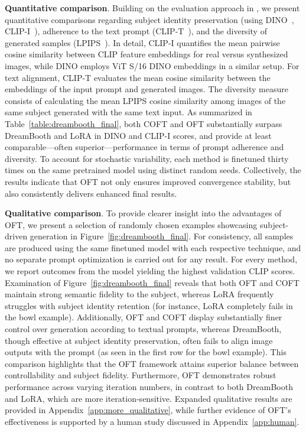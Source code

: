 \textbf{Quantitative comparison}. Building on the evaluation approach in \cite{ruiz2023dreambooth}, we present quantitative comparisons regarding subject identity preservation (using DINO~\cite{caron2021emerging}, CLIP-I~\cite{radford2021learning}), adherence to the text prompt (CLIP-T~\cite{radford2021learning}), and the diversity of generated samples (LPIPS~\cite{zhang2018unreasonable}). In detail, CLIP-I quantifies the mean pairwise cosine similarity between CLIP feature embeddings for real versus synthesized images, while DINO employs ViT S/16 DINO embeddings in a similar setup. For text alignment, CLIP-T evaluates the mean cosine similarity between the embeddings of the input prompt and generated images. The diversity measure consists of calculating the mean LPIPS cosine similarity among images of the same subject generated with the same text input. As summarized in Table~\ref{table:dreambooth_final}, both COFT and OFT substantially surpass DreamBooth and LoRA in DINO and CLIP-I scores, and provide at least comparable—often superior—performance in terms of prompt adherence and diversity. To account for stochastic variability, each method is finetuned thirty times on the same pretrained model using distinct random seeds. Collectively, the results indicate that OFT not only ensures improved convergence stability, but also consistently delivers enhanced final results.

\textbf{Qualitative comparison}. To provide clearer insight into the advantages of OFT, we present a selection of randomly chosen examples showcasing subject-driven generation in Figure~\ref{fig:dreambooth_final}. For consistency, all samples are produced using the same finetuned model with each respective technique, and no separate prompt optimization is carried out for any result. For every method, we report outcomes from the model yielding the highest validation CLIP scores. Examination of Figure~\ref{fig:dreambooth_final} reveals that both OFT and COFT maintain strong semantic fidelity to the subject, whereas LoRA frequently struggles with subject identity retention (for instance, LoRA completely fails in the bowl example). Additionally, OFT and COFT display substantially finer control over generation according to textual prompts, whereas DreamBooth, though effective at subject identity preservation, often fails to align image outputs with the prompt (as seen in the first row for the bowl example). This comparison highlights that the OFT framework attains superior balance between controllability and subject fidelity. Furthermore, OFT demonstrates robust performance across varying iteration numbers, in contrast to both DreamBooth and LoRA, which are more iteration-sensitive. Expanded qualitative results are provided in Appendix~\ref{app:more_qualitative}, while further evidence of OFT's effectiveness is supported by a human study discussed in Appendix~\ref{app:human}.

